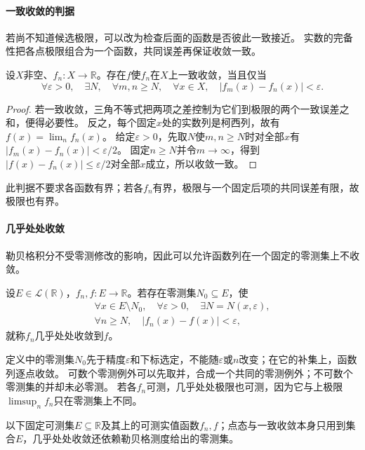 \paragraph{一致收敛的判据}
若尚不知道候选极限，可以改为检查后面的函数是否彼此一致接近。
实数的完备性把各点极限组合为一个函数，共同误差再保证收敛一致。
\begin{theorem}[实值函数列的一致柯西判据]
\label{thm:analysis-uniform-cauchy-criterion}
设$X$非空、$f_n:X\to\mathbb R$。存在$f$使$f_n$在$X$上一致收敛，当且仅当
\[
 \forall\varepsilon>0,\quad\exists N,\quad
 \forall m,n\geq N,\quad\forall x\in X,\quad
 |f_m(x)-f_n(x)|<\varepsilon.
\]
\end{theorem}
\begin{proof}
若一致收敛，三角不等式把两项之差控制为它们到极限的两个一致误差之和，便得必要性。
反之，每个固定$x$处的实数列是柯西列，故有$f(x)=\lim_n f_n(x)$。
给定$\varepsilon>0$，先取$N$使$m,n\geq N$时对全部$x$有$|f_m(x)-f_n(x)|<\varepsilon/2$。
固定$n\geq N$并令$m\to\infty$，得到$|f(x)-f_n(x)|\leq\varepsilon/2$对全部$x$成立，所以收敛一致。
\end{proof}
此判据不要求各函数有界；若各$f_n$有界，极限与一个固定后项的共同误差有限，故极限也有界。

\paragraph{几乎处处收敛}
勒贝格积分不受零测修改的影响，因此可以允许函数列在一个固定的零测集上不收敛。
\begin{definition}[几乎处处收敛]
\label{def:analysis-almost-everywhere-convergence}
设$E\in\mathcal L(\mathbb R)$，$f_n,f:E\to\mathbb R$。若存在零测集$N_0\subseteq E$，使
\[
 \begin{gathered}
 \forall x\in E\setminus N_0,\quad
 \forall\varepsilon>0,\quad
 \exists N=N(x,\varepsilon),\\
 \forall n\geq N,\quad |f_n(x)-f(x)|<\varepsilon,
 \end{gathered}
\]
就称$f_n$几乎处处收敛到$f$。
\end{definition}
定义中的零测集$N_0$先于精度$\varepsilon$和下标选定，不能随$\varepsilon$或$n$改变；在它的补集上，函数列逐点收敛。
可数个零测例外可以先取并，合成一个共同的零测例外；不可数个零测集的并却未必零测。
若各$f_n$可测，几乎处处极限也可测，因为它与上极限$\limsup_nf_n$只在零测集上不同。

以下固定可测集$E\subseteq\mathbb R$及其上的可测实值函数$f_n,f$；点态与一致收敛本身只用到集合$E$，几乎处处收敛还依赖勒贝格测度给出的零测集。

